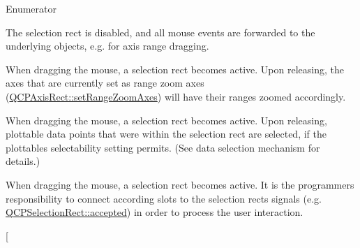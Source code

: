 \begin{Desc}
\item[Enumerator]\par
\begin{description}
\item[{\em 
srm\+None\hypertarget{namespace_q_c_p_ac9aa4d6d81ac76b094f9af9ad2d3aacfa894e973fdf7efc6174a9de50babb19fd}{}\label{namespace_q_c_p_ac9aa4d6d81ac76b094f9af9ad2d3aacfa894e973fdf7efc6174a9de50babb19fd}
}]The selection rect is disabled, and all mouse events are forwarded to the underlying objects, e.\+g. for axis range dragging. \item[{\em 
srm\+Zoom\hypertarget{namespace_q_c_p_ac9aa4d6d81ac76b094f9af9ad2d3aacfaaadea13ba6846072eb23d5f182be0fe3}{}\label{namespace_q_c_p_ac9aa4d6d81ac76b094f9af9ad2d3aacfaaadea13ba6846072eb23d5f182be0fe3}
}]When dragging the mouse, a selection rect becomes active. Upon releasing, the axes that are currently set as range zoom axes (\hyperlink{class_q_c_p_axis_rect_a9442cca2aa358405f39a64d51eca13d2}{Q\+C\+P\+Axis\+Rect\+::set\+Range\+Zoom\+Axes}) will have their ranges zoomed accordingly. \item[{\em 
srm\+Select\hypertarget{namespace_q_c_p_ac9aa4d6d81ac76b094f9af9ad2d3aacfa590be33019df7ba5276a8457a5c769c1}{}\label{namespace_q_c_p_ac9aa4d6d81ac76b094f9af9ad2d3aacfa590be33019df7ba5276a8457a5c769c1}
}]When dragging the mouse, a selection rect becomes active. Upon releasing, plottable data points that were within the selection rect are selected, if the plottable\textquotesingle{}s selectability setting permits. (See data selection mechanism for details.) \item[{\em 
srm\+Custom\hypertarget{namespace_q_c_p_ac9aa4d6d81ac76b094f9af9ad2d3aacfa88e34810ad5d2866d3857db386cbb442}{}\label{namespace_q_c_p_ac9aa4d6d81ac76b094f9af9ad2d3aacfa88e34810ad5d2866d3857db386cbb442}
}]When dragging the mouse, a selection rect becomes active. It is the programmer\textquotesingle{}s responsibility to connect according slots to the selection rect\textquotesingle{}s signals (e.\+g. \hyperlink{class_q_c_p_selection_rect_a15a43542e1f7b953a44c260b419e6d2c}{Q\+C\+P\+Selection\+Rect\+::accepted}) in order to process the user interaction. \item[{\em 
}
\end{description}
\end{Desc}
